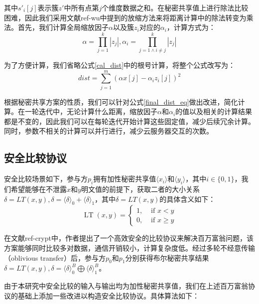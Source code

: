 其中$s'_i[j]$表示簇$z'$中所有点第$j$个维度数据之和。在秘密共享值上进行除法比较困难，因此我们采用文献ref-wu中提到的放缩方法来将距离计算中的除法转变为乘法。首先，我们计算全局缩放因子$\alpha$以及簇$z_i$对应的$\alpha_i$，计算方式为：
\begin{equation}
    \label{cal_scale}
    \alpha=\prod_{j=1}^{k}\left|z_{j}\right|, \alpha_{i}=\prod_{j=1 \wedge i \neq j}^{k}\left|z_{j}\right|
\end{equation}

为了方便计算，我们省略公式\ref{cal_dist}中的根号计算，将整个公式改写为：
\begin{equation}
    \label{final_dist_eq}
    dist = \sum_{j=1}^{m}(\alpha x[j] - \alpha_{i}z_i[j])^2
\end{equation}

根据秘密共享方案的性质，我们可以针对公式\ref{final_dist_eq}做出改进，简化计算。在一轮迭代中，无论计算什么距离，缩放因子$\alpha$和$\alpha_i$的值以及相关的计算结果都是不变的，因此我们可以在每轮迭代开始计算这些固定值，减少后续冗余计算。同时，参数不相关的计算可以并行进行，减少云服务器交互的次数。

\subsection{安全比较协议}
安全比较场景如下，参与方$p_i$拥有加性秘密共享值$\langle x_i \rangle$和$\langle y_i \rangle$，其中$i \in \{0, 1\}$，我们希望能够在不泄露$x$和$y$明文值的前提下，获取二者的大小关系$\delta = LT(x, y), \delta = \langle \delta \rangle_0 + \langle \delta \rangle_1$，其中$\delta = LT(x, y)$的具体含义如下：
\begin{equation}
    \operatorname{LT}(x, y)= \begin{cases}1, & \text { if } x<y \\ 0, & \text { if } x \geq y\end{cases}
\end{equation}

在文献ref-crypt中，作者提出了一个高效安全的比较协议来解决百万富翁问题，该方案能够同时比较多对数据，通信开销较小，计算复杂度低。经过多轮不经意传输（oblivious transfer）后，参与方$p_0$和$p_1$分别获得布尔秘密共享结果$\delta = LT(x, y) ,\delta = \langle \delta \rangle^B_0 \bigoplus \langle \delta \rangle^B_1$。

由于本研究中安全比较的输入与输出均为加性秘密共享值，我们在上述百万富翁协议的基础上添加一些改进以构造安全比较协议。具体算法如下：

